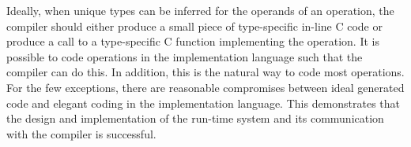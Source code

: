 Ideally, when unique types can be inferred for the operands of an
operation, the compiler should either produce a small piece of
type-specific in-line C code or produce a call to a type-specific C
function implementing the operation. It is possible to code operations
in the implementation language such that the compiler can do this. In
addition, this is the natural way to code most operations. For the few
exceptions, there are reasonable compromises between ideal generated
code and elegant coding in the implementation language. This
demonstrates that the design and implementation of the run-time system
and its communication with the compiler is successful.

